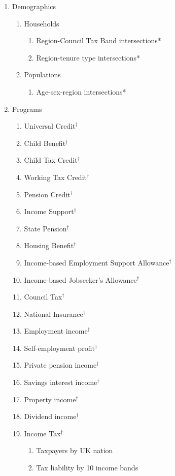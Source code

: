 \documentclass[10pt,journal,compsoc]{IEEEtran}
\begin{document}
\begin{enumerate}
  \item Demographics
  \begin{enumerate}
    \item Households
    \begin{enumerate}
      \item Region-Council Tax Band intersections*
      \item Region-tenure type intersections*
    \end{enumerate}
    \item Populations
    \begin{enumerate}
      \item Age-sex-region intersections*
    \end{enumerate}
  \end{enumerate}
  \item Programs
  \begin{enumerate}
    \item Universal Credit$^\dagger$
    \item Child Benefit$^\dagger$
    \item Child Tax Credit$^\dagger$
    \item Working Tax Credit$^\dagger$
    \item Pension Credit$^\dagger$
    \item Income Support$^\dagger$
    \item State Pension$^\dagger$
    \item Housing Benefit$^\dagger$
    \item Income-based Employment Support Allowance$^\dagger$
    \item Income-based Jobseeker's Allowance$^\dagger$
    \item Council Tax$^\dagger$
    \item National Insurance$^\dagger$
    \item Employment income$^\dagger$
    \item Self-employment profit$^\dagger$
    \item Private pension income$^\dagger$
    \item Savings interest income$^\dagger$
    \item Property income$^\dagger$
    \item Dividend income$^\dagger$
    \item Income Tax$^\dagger$
    \begin{enumerate}
      \item Taxpayers by UK nation
      \item Tax liability by 10 income bands
    \end{enumerate}
  \end{enumerate}
\end{enumerate}
\end{document}
